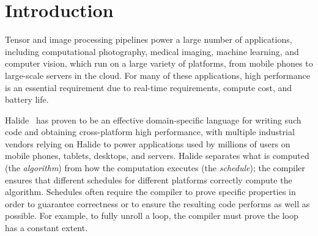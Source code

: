 \documentclass[acmsmall,review,anonymous]{acmart}\settopmatter{printfolios=true,printccs=false,printacmref=false}
\begin{document}




\maketitle


\section{Introduction}
Tensor and image processing pipelines power a large number of applications,
including computational photography, medical imaging, machine learning,
and computer vision, which run on a large variety of platforms, from
mobile phones to large-scale servers in the cloud.  For many of these
applications, high performance is an essential requirement due to real-time
requirements, compute cost, and battery life.

Halide~\cite{ragankelley2012halide, ragankelley2013halide} has proven to be an effective
domain-specific language for writing such code and obtaining cross-platform
high performance, with multiple industrial vendors relying on Halide to power
applications used by millions of users on mobile phones, tablets, desktops, and
servers.  Halide separates what is computed (the \textit{algorithm}) from how
the computation executes (the \textit{schedule}); the compiler ensures that
different schedules for different platforms correctly compute the algorithm.
Schedules often require the compiler to prove specific properties in order
to guarantee correctness or to ensure the resulting code performs as well
as possible.  For example, to fully unroll a loop, the compiler must prove
the loop has a constant extent.
\end{document}
